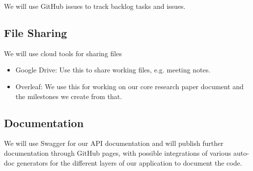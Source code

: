 We will use GitHub issues to track backlog tasks and issues.

\subsection{File Sharing}

We will use cloud tools for sharing files
\begin{itemize}
    \item Google Drive: Use this to share working files, e.g. meeting notes. 
    \item Overleaf: We use this for working on our core research paper document and the milestones we create from that.
\end{itemize}

\subsection{Documentation}
We will use Swagger for our API documentation and will publish further documentation through GitHub pages, with possible integrations of various auto-doc generators for the different layers of our application to document the code.
